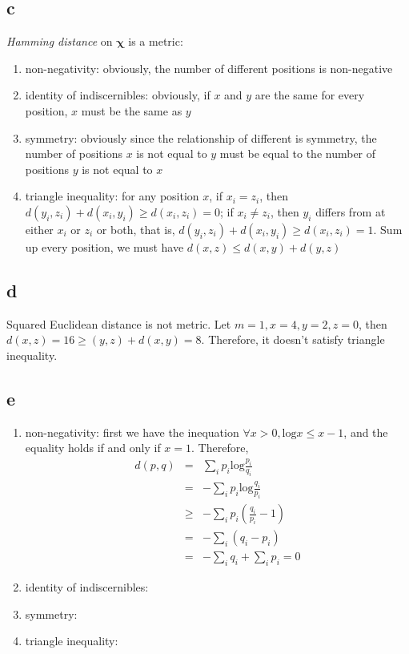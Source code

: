 \documentclass[a4paper,11pt]{article}
\theoremstyle{mytheor}
\begin{document}
\subsection*{c}
\textit{Hamming distance} on $\mathbf{\chi}$ is  a metric:
\begin{enumerate}
	\item non-negativity: obviously, the number of different positions is non-negative
	\item identity of indiscernibles: obviously, if $x$ and $y$ are the same for every position, $x$ must be the same as $y$
	\item symmetry: obviously since the relationship of different is symmetry, the number of positions $x$ is not equal to $y$ must be equal to 
	the number of positions $y$ is not equal to $x$ 
	\item triangle inequality: for any position $x$, if $x_i = z_i$, then $d(y_i,z_i) + d(x_i, y_i) \geq d(x_i, z_i) = 0$; if $x_i \neq z_i$, then
	$y_i$ differs from at either $x_i$ or $z_i$ or both, that is, $d(y_i,z_i) + d(x_i, y_i) \geq d(x_i, z_i) = 1$. Sum up every position, we must have
	$d(x,z) \leq d(x,y) + d(y,z)$
\end{enumerate}

\subsection*{d}
Squared Euclidean distance is not metric. Let $m = 1, x= 4, y= 2, z= 0$, then $d(x,z) = 16 \geq (y,z) + d(x,y) = 8$. Therefore, it doesn't satisfy 
triangle inequality. 


\subsection*{e}
\begin{enumerate}
	\item non-negativity: first we have the inequation $\forall x > 0, \text{log}x \leq x-1$, and the equality holds if and only if $x = 1$. Therefore,
	\begin{eqnarray*}
		d(p,q) &=& \sum_{i}p_i \text{log}\frac{p_i}{q_i} \\
				&=& -\sum_{i}p_i \text{log}\frac{q_i}{p_i} \\
				&\geq& -\sum_{i}p_i (\frac{q_i}{p_i} - 1) \\
				&=&-\sum_{i}(q_i - p_i) \\
				&=&-\sum_{i} q_i + \sum_{i}p_i = 0
	\end{eqnarray*}
	\item identity of indiscernibles:
	\item symmetry: 
	\item triangle inequality: 
\end{enumerate}
\end{document}
